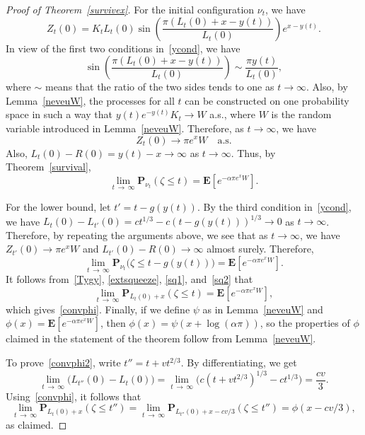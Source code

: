 \documentclass[AHL,Unicode,longabstracts,published]{cedram}
\newcommand*\E{\mathbf{E}}
\renewcommand*\P{\mathbf{P}}
\newcommand{\1} {\mathds{1}}
\begin{document}
\begin{proof}[Proof of Theorem~\ref{survivex}]
For the initial configuration $\nu_t$, we have
\[
Z_t(0) = K_t L_t(0) \sin \left(\frac{\pi \left(L_t(0) + x - y(t)\right)}{L_t(0)} \right) e^{x - y(t)}.
\]
In view of the first two conditions in~\eqref{ycond}, we have
\[
\sin \left(\frac{\pi \left(L_t(0) + x - y(t)\right)}{L_t(0)} \right) \sim \frac{\pi y(t)}{L_t(0)},
\]
where $\sim$ means that the ratio of the two sides tends to one as $t \rightarrow \infty$. Also, by Lemma~\ref{neveuW}, the processes for all $t$ can be constructed on one probability space in such a way that
$y(t) e^{-y(t)} K_t \rightarrow W$ a.s., where $W$ is the random variable introduced in Lemma~\ref{neveuW}. Therefore, as $t \rightarrow \infty$, we have
\[
Z_t(0) \rightarrow \pi e^x W \quad\text{a.s.}
\]
Also, $L_t(0) - R(0) = y(t) - x \rightarrow \infty$ as $t \rightarrow \infty$.
Thus, by Theorem~\ref{survival},
\begin{equation}\label{sq1}
\lim_{t\,\rightarrow\,\infty} \P_{\nu_t}(\zeta \leq t) = \E\left[e^{-\alpha \pi e^x W}\right].
\end{equation}

For the lower bound, let $t' = t - g(y(t))$. By the third condition in~\eqref{ycond}, we have $L_t(0) - L_{t'}(0) = c t^{1/3} - c (t - g(y(t)))^{1/3} \rightarrow 0$ as $t \rightarrow \infty$. Therefore, by repeating the arguments above, we see that as $t \rightarrow \infty$, we have $Z_{t'}(0) \rightarrow \pi e^x W$ and $L_{t'}(0) - R(0) \rightarrow \infty$ almost surely. Therefore,
\begin{equation}\label{sq2}
\lim_{t\,\rightarrow\,\infty} \P_{\nu_t}\big(\zeta \leq t - g(y(t))\big) = \E\left[e^{-\alpha \pi e^x W}\right].
\end{equation}
It follows from~\eqref{Tygy}, \eqref{extsqueeze}, \eqref{sq1}, and~\eqref{sq2} that
\[
\lim_{t\,\rightarrow\,\infty} \P_{L_t(0) + x}(\zeta \leq t) = \E\left[e^{-\alpha \pi e^x W}\right],
\]
which gives~\eqref{convphi}. Finally, if we define $\psi$ as in Lemma~\ref{neveuW} and $\phi(x) = \E[e^{-\alpha \pi e^x W}]$, then $\phi(x) = \psi(x + \log(\alpha \pi))$, so the properties of $\phi$ claimed in the statement of the theorem follow from Lemma~\ref{neveuW}.

To prove~\eqref{convphi2}, write $t'' = t + v t^{2/3}$. By differentiating, we get
\begin{equation}\label{tpt}
\lim_{t\,\rightarrow\,\infty} \big(L_{t''}(0) - L_t(0) \big) = \lim_{t\,\rightarrow\,\infty} \big(c\left(t + v t^{2/3}\right)^{1/3} - c t^{1/3} \big) = \frac{cv}{3}.
\end{equation}
Using~\eqref{convphi}, it follows that
\[
\lim_{t\,\rightarrow\,\infty} \P_{L_t(0) + x}\left(\zeta \leq t''\right) = \lim_{t\,\rightarrow\,\infty} \P_{L_{t''}(0) + x - cv/3}\left(\zeta \leq t''\right) = \phi(x - cv/3),
\]
as claimed.
\end{proof}
\end{document}
